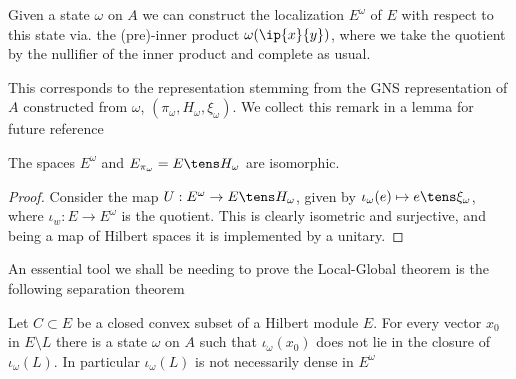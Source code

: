 \begin{definition}Given a state $\omega$ on $A$ we can construct the localization $E^\omega$ of $E$ with respect to this state via. the (pre)-inner product $\omega(\ip{x}{y})$, where we take the quotient by the nullifier of the inner product and complete as usual. 
\end{definition}
 This corresponds to the representation stemming from the GNS representation of $A$ constructed from $\omega$, $(\pi_\omega,H_\omega,\xi_\omega)$. 
We collect this remark in a lemma for future reference
\begin{lemma}
	The spaces $E^\omega$ and $E_{\pi_\omega}=E \tens H_\omega$ are isomorphic.
\end{lemma}
\begin{proof}
	Consider the map $U:E^\omega \to E\tens H_\omega$, given by $\iota_\omega(e)\mapsto e\tens \xi_\omega$, where $\iota_w: E\to E^\omega$ is the quotient. This is clearly isometric and surjective, and being a map of Hilbert spaces it is implemented by a unitary.
\end{proof}
An essential tool we shall be needing to prove the Local-Global theorem is the following separation theorem 
\begin{theorem}\label{separationthmweak}
	Let $C\subset E$ be a closed convex subset of a Hilbert module $E$. For every vector $x_0$ in $E\setminus L$ there is a state $\omega$ on $A$ such that $\iota_\omega(x_0)$ does not lie in the closure of $\iota_\omega(L)$. In particular $\iota_\omega(L)$ is not necessarily dense in $E^\omega$
\end{theorem}
